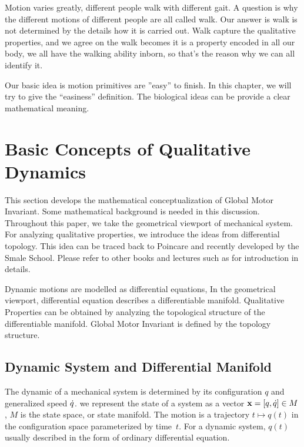 Motion varies greatly, different people walk with different gait. 
A question is why the different motions of different people are all called walk.
Our answer is walk is not determined by the details how it is carried out.
Walk capture the qualitative properties, and we agree on the walk becomes it is a property encoded in all our body, we all have the walking ability inborn, so that’s the reason why we can all identify it.


Our basic idea is motion primitives are ''easy'' to finish. 
In this chapter, we will try to give the “easiness” definition.
The biological ideas can be provide a clear mathematical meaning.


\section{Basic Concepts of Qualitative Dynamics}
This section develops the mathematical conceptualization of Global Motor Invariant.
Some mathematical background is needed in this discussion.
Throughout this paper, we take the geometrical viewport of mechanical system.
For analyzing qualitative properties, we introduce the ideas from differential topology.
This idea can be traced back to Poincare\citep{Poincar'e1899,Poincar'e1885} and recently developed by the Smale School\citep{Smale1970}.
Please refer to other books and lectures such as \citep{abraham1978foundations}for introduction in details.


Dynamic motions are modelled as differential equations,
In the geometrical viewport, differential equation describes a differentiable manifold.
Qualitative Properties can be obtained by analyzing the topological structure of the differentiable manifold.
Global Motor Invariant is defined by the topology structure.



\subsection{Dynamic System and Differential Manifold}



The dynamic of a mechanical system is determined by its configuration  $q$ and generalized speed $\dot{q}$. 
we represent the state of a system as a vector $\mathbf{x}=[q,\dot{q}] \in M$,  $M$ is the state space, or state manifold.
The motion is a trajectory $t \mapsto q(t)$ in the configuration space parameterized by time~$t$.
For a dynamic system, $q(t)$ usually described in the form of  ordinary differential equation. 


